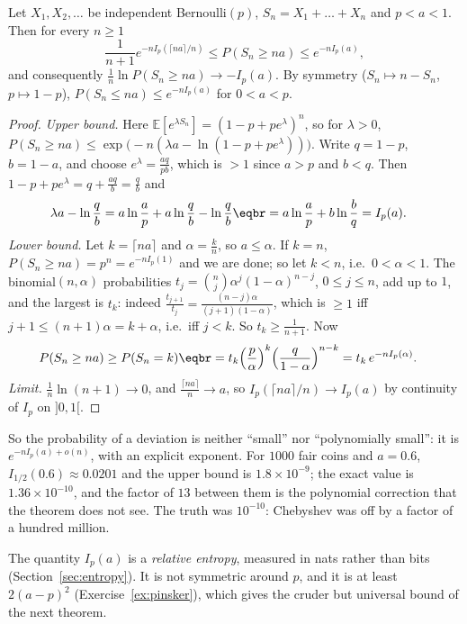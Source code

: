 \begin{theorem}\label{thm:cramer}
Let $X_1,X_2,\ldots$ be independent Bernoulli$(p)$, $S_n=X_1+\dots+X_n$ and $p<a<1$. Then for every $n\ge1$
\[
\frac1{n+1}e^{-nI_p(\lceil na\rceil/n)}\le P(S_n\ge na)\le e^{-nI_p(a)},
\]
and consequently $\frac1n\ln P(S_n\ge na)\to-I_p(a)$. By symmetry ($S_n\mapsto n-S_n$, $p\mapsto 1-p$),
$P(S_n\le na)\le e^{-nI_p(a)}$ for $0<a<p$.
\end{theorem}
\begin{proof}
\emph{Upper bound.} Here $\mathbb E[e^{\lambda S_n}]=(1-p+pe^\lambda)^n$, so for $\lambda>0$, $P(S_n\ge na)\le\exp\bigl(-n(\lambda a-\ln(1-p+pe^\lambda))\bigr)$.
Write $q=1-p$, $b=1-a$, and choose $e^\lambda=\frac{aq}{pb}$, which is $>1$ since $a>p$ and $b<q$. Then $1-p+pe^\lambda=q+\frac{aq}b=\frac qb$ and
\[
\begin{aligned}\lambda a-\ln\frac qb&=a\ln\frac ap+a\ln\frac qb-\ln\frac qb\eqbr=a\ln\frac ap+b\ln\frac bq=I_p(a).\end{aligned}
\]
\emph{Lower bound.} Let $k=\lceil na\rceil$ and $\alpha=\frac kn$, so $a\le\alpha$. If $k=n$, $P(S_n\ge na)=p^n=e^{-nI_p(1)}$ and we are done; so let
$k<n$, i.e.\ $0<\alpha<1$. The binomial$(n,\alpha)$ probabilities $t_j=\binom nj\alpha^j(1-\alpha)^{n-j}$, $0\le j\le n$, add up to $1$, and the largest is $t_k$:
indeed $\frac{t_{j+1}}{t_j}=\frac{(n-j)\alpha}{(j+1)(1-\alpha)}$, which is $\ge1$ iff $j+1\le(n+1)\alpha=k+\alpha$, i.e.\ iff $j<k$. So $t_k\ge\frac1{n+1}$. Now
\[
\begin{aligned}P(S_n\ge na)&\ge P(S_n=k)\eqbr=t_k\Bigl(\frac p\alpha\Bigr)^k\Bigl(\frac q{1-\alpha}\Bigr)^{n-k}=t_k\,e^{-nI_p(\alpha)}.\end{aligned}
\]
\emph{Limit.} $\frac1n\ln(n+1)\to0$, and $\frac{\lceil na\rceil}n\to a$, so $I_p(\lceil na\rceil/n)\to I_p(a)$ by continuity of $I_p$ on $]0,1[$.
\end{proof}

So the probability of a deviation is neither ``small'' nor ``polynomially small'': it is $e^{-nI_p(a)+o(n)}$, with an explicit
exponent. For $1000$ fair coins and $a=0.6$, $I_{1/2}(0.6)\approx0.0201$ and the upper bound is $1.8\times10^{-9}$; the exact value is
$1.36\times10^{-10}$, and the factor of $13$ between them is the polynomial correction that the theorem does not see. The
truth was $10^{-10}$: Chebyshev was off by a factor of a hundred million.

The quantity $I_p(a)$ is a \emph{relative entropy}, measured in nats rather than bits (Section~\ref{sec:entropy}). It is not
symmetric around $p$, and it is at least $2(a-p)^2$ (Exercise~\ref{ex:pinsker}), which gives the cruder but universal bound
of the next theorem.

